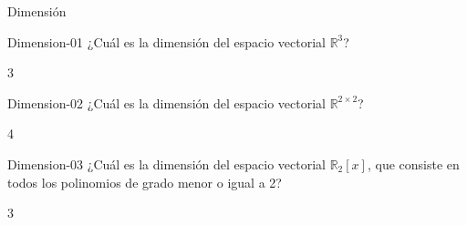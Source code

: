 \documentclass[a4,11pt]{aleph-notas}
\begin{document}
\begin{quiz}{Dimensión}
\begin{numerical}[tolerance=0]%
    {Dimension-01}
    ¿Cuál es la dimensión del espacio vectorial \( \mathbb{R}^3 \)?
    \item 3
\end{numerical}

\begin{numerical}[tolerance=0]%
    {Dimension-02}
    ¿Cuál es la dimensión del espacio vectorial $\mathbb{R}^{2\times 2}$?
    \item 4
\end{numerical}

\begin{numerical}[tolerance=0]%
    {Dimension-03}
    ¿Cuál es la dimensión del espacio vectorial \( \mathbb{R}_2[x] \), que consiste en todos los polinomios de grado menor o igual a 2?
    \item 3
\end{numerical}


\end{quiz}
\end{document}
